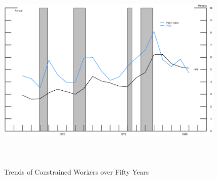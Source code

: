 \clearpage

\begin{figure}[h]
\begin{center}
\caption{Trends of Constrained Workers over Fifty Years \label{inf}}
\includegraphics[width=5in, height=4in]{figure1.eps}
\end{center}
\end{figure}

\newpage

